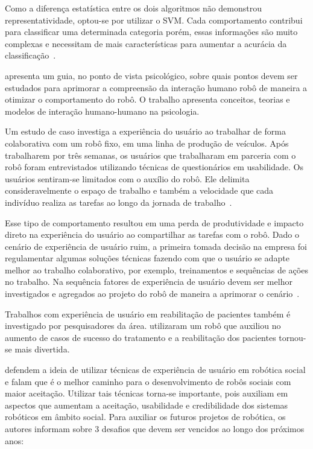Como a diferença estatística entre os dois algoritmos não demonstrou representatividade, optou-se por utilizar o SVM. Cada comportamento contribui para classificar uma determinada categoria porém, essas informações são muito complexas e necessitam de mais características para aumentar a acurácia da classificação~\cite{jokinen:2015}.

 apresenta um guia, no ponto de vista psicológico, sobre quais pontos devem ser estudados para aprimorar a compreensão da interação humano robô de maneira a otimizar o comportamento do robô. O trabalho apresenta conceitos, teorias e modelos de interação humano-humano na psicologia.

Um estudo de caso investiga a experiência do usuário ao trabalhar de forma colaborativa com um robô fixo, em uma linha de produção de veículos. Após trabalharem por três semanas, os usuários que trabalharam em parceria com o robô foram entrevistados utilizando técnicas de questionários em usabilidade. Os usuários sentiram-se limitados com o auxílio do robô. Ele delimita consideravelmente o espaço de trabalho e também a velocidade que cada indivíduo realiza as tarefas ao longo da jornada de trabalho~\cite{weiss:2016}.

Esse tipo de comportamento resultou em uma perda de produtividade e impacto direto na experiência do usuário ao compartilhar as tarefas com o robô. Dado o cenário de experiência de usuário ruim, a primeira tomada decisão na empresa foi regulamentar algumas soluções técnicas fazendo com que o usuário se adapte melhor ao trabalho colaborativo, por exemplo, treinamentos e sequências de ações no trabalho. Na sequência fatores de experiência de usuário devem ser melhor investigados e agregados ao projeto do robô de maneira a aprimorar o cenário~\cite{weiss:2016}.

Trabalhos com experiência de usuário em reabilitação de pacientes também é investigado por pesquisadores da área.  utilizaram um robô que auxiliou no aumento de casos de sucesso do tratamento e a reabilitação dos pacientes tornou-se mais divertida.

 defendem a ideia de utilizar técnicas de experiência de usuário em robótica social e falam que é o melhor caminho para o desenvolvimento de robôs sociais com maior aceitação. Utilizar tais técnicas torna-se importante, pois auxiliam em aspectos que aumentam a aceitação, usabilidade e credibilidade dos sistemas robóticos em âmbito social. Para auxiliar os futuros projetos de robótica, os autores informam sobre 3 desafios que devem ser vencidos ao longo dos próximos anos:

